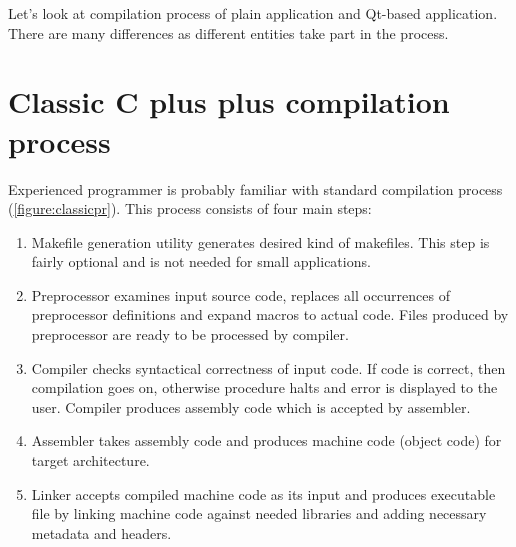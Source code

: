 Let's look at compilation process of plain \cpp{} application and Qt-based application. There are many differences as different entities take part in the process.

\section{Classic C plus plus compilation process}
Experienced \cpp{} programmer is probably familiar with standard compilation process (\autoref{figure:classicpr}). This process consists of four main steps:
\begin{enumerate}
\item Makefile generation utility generates desired kind of makefiles. This step is fairly optional and is not needed for small applications.
\item Preprocessor examines input source code, replaces all occurrences of preprocessor definitions and expand macros to actual code. Files produced by preprocessor are ready to be processed by compiler.
\item Compiler checks syntactical correctness of input \cpp{} code. If code is correct, then compilation goes on, otherwise procedure halts and error is displayed to the user. Compiler produces assembly code which is accepted by assembler.
\item Assembler takes assembly code and produces machine code (object code) for target architecture.
\item Linker accepts compiled machine code as its input and produces executable file by linking machine code against needed libraries and adding necessary metadata and headers.
\end{enumerate}


